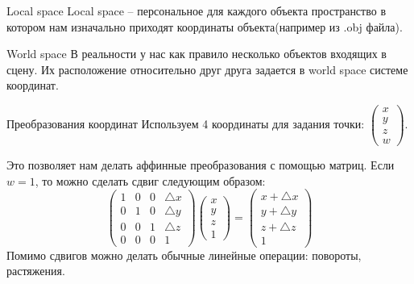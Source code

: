 \documentclass{beamer}
\begin{document}
\begin{frame}{Local space}
    Local space -- персональное для каждого объекта пространство в котором нам изначально приходят 
    координаты объекта(например из .obj файла). 
\end{frame}
\begin{frame}{World space}
    В реальности у нас как правило несколько объектов входящих в 
    сцену. Их расположение относительно друг друга задается в world space 
    системе координат.
\end{frame}

\begin{frame}{Преобразования координат}
    Используем 4 координаты для задания точки: $\begin{pmatrix}
        x\\ y\\ z\\ w
    \end{pmatrix}$.

    Это позволяет нам делать аффинные преобразования с помощью матриц.
    Если $w=1$, то можно сделать сдвиг следующим образом:
    \[
        \begin{pmatrix}
            1 & 0 & 0 & \triangle x\\
            0 & 1 & 0 & \triangle y\\
            0 & 0 & 1 & \triangle z\\
            0 & 0 & 0 & 1
        \end{pmatrix}
        \begin{pmatrix}
            x\\ y\\ z\\ 1
        \end{pmatrix} = 
        \begin{pmatrix}
            x + \triangle x\\
            y + \triangle y\\
            z + \triangle z\\
            1
        \end{pmatrix}
    \]
    Помимо сдвигов можно делать обычные линейные операции:
    повороты, растяжения.
\end{frame}
\end{document}
